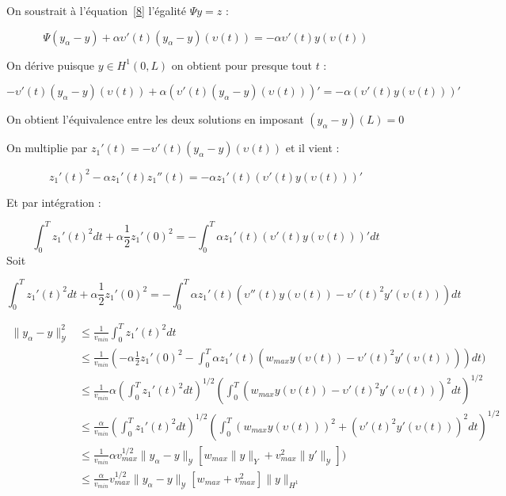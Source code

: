 \documentclass[a4paper]{article}
\newcommand{\Y}{\mathscr{Y}}
\begin{document}
\begin{preuve}
On soustrait à l'équation~\eqref{8} 
l'égalité $\Psi y = z$ :

\[
\Psi (y_\alpha - y) + \alpha \upsilon'(t)(y_\alpha - y)(\upsilon(t)) = -\alpha \upsilon'(t) y(\upsilon(t))
\]

On dérive puisque $y \in H^1(0,L)$ on obtient pour presque tout $t$ :

 \[
 - \upsilon'(t)(y_\alpha - y)(\upsilon(t)) + \alpha (\upsilon'(t)(y_\alpha - y)(\upsilon(t)))' = -\alpha (\upsilon'(t) y(\upsilon(t)))'
 \]
 
 On obtient l'équivalence entre les deux solutions en imposant $(y_\alpha - y)(L)=0$
 
 On multiplie par $z_1'(t) =  - \upsilon'(t)(y_\alpha - y)(\upsilon(t)) $ et il vient :
 
 \[
 z_1'(t)^2 - \alpha z_1'(t)z_1 ''(t) = -\alpha z_1'(t)(\upsilon'(t) y(\upsilon(t)))'
 \]

Et par intégration :

\[
\int_0^T z_1'(t)^2dt + \alpha \displaystyle \frac{1}{2} z_1 '(0)^2 
  = -\int_0^T \alpha z_1'(t)(\upsilon'(t) y(\upsilon(t)))' dt
\] 
Soit 

\[
\int_0^T z_1'(t)^2dt + \alpha \displaystyle \frac{1}{2} z_1 '(0)^2 
  = -\int_0^T \alpha z_1'(t)(\upsilon''(t) y(\upsilon(t)) - \upsilon'(t)^2 y'(\upsilon(t))) dt
\] 

\[
\begin{split}
	\| y_\alpha - y \|_{\Y}^2 
	     & \leq \displaystyle \frac{1}{v_{min}} \int_0^T z_1'(t)^2 dt \\
		 & \leq \displaystyle \frac{1}{v_{min}}
		        ( -\alpha \displaystyle \frac{1}{2} z_1 '(0)^2 
				-  \int_0^T \alpha z_1'(t)(w_{max}y(\upsilon(t))
				- \upsilon'(t)^2 y'(\upsilon(t))) )  dt) \\
	   		 & \leq \displaystyle \frac{1}{v_{min}}
	   		        \alpha (\int_0^T  z_1'(t)^2 dt )^{1/2}
					(\int_0^T (w_{max}y(\upsilon(t))
	   				- \upsilon'(t)^2 y'(\upsilon(t)))^2  dt)^{1/2} \\
  		 & \leq \displaystyle \frac{\alpha}{v_{min}}
  		        (\int_0^T  z_1'(t)^2 dt )^{1/2}
			(\int_0^T (w_{max}y(\upsilon(t)))^2
  				+ (\upsilon'(t)^2 y'(\upsilon(t)))^2  dt)^{1/2} \\
		& \leq \displaystyle \frac{1}{v_{min}}
				  \alpha v_{max}^{1/2}\| y_\alpha - y \|_{\Y}
				  [w_{max} \|y\|_{Y} + v_{max}^2 \| y' \|_{\Y}]  ) \\
		& \leq \displaystyle \frac{\alpha}{v_{min}}
		      v_{max}^{1/2}\| y_\alpha - y \|_{\Y}
				[w_{max} + v_{max}^2] \|y\|_{H^1}  
\end{split}
\]		 



\end{preuve}
\end{document}
